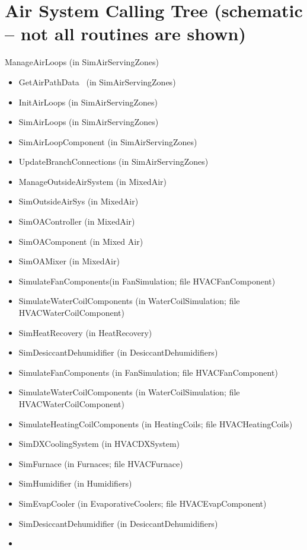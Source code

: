 \section{Air System Calling Tree (schematic -- not all routines are shown)}\label{air-system-calling-tree-schematic-not-all-routines-are-shown}

ManageAirLoops (in SimAirServingZones)

\begin{itemize}
\item
  GetAirPathData~ (in SimAirServingZones)
\item
  InitAirLoops (in SimAirServingZones)
\item
  SimAirLoops (in SimAirServingZones)
\item
  SimAirLoopComponent (in SimAirServingZones)
\item
  UpdateBranchConnections (in SimAirServingZones)
\item
  ManageOutsideAirSystem (in MixedAir)
\item
  SimOutsideAirSys (in MixedAir)
\item
  SimOAController (in MixedAir)
\item
  SimOAComponent (in Mixed Air)
\item
  SimOAMixer (in MixedAir)
\item
  SimulateFanComponents(in FanSimulation; file HVACFanComponent)
\item
  SimulateWaterCoilComponents (in WaterCoilSimulation; file HVACWaterCoilComponent)
\item
  SimHeatRecovery (in HeatRecovery)
\item
  SimDesiccantDehumidifier (in DesiccantDehumidifiers)
\item
  SimulateFanComponents (in FanSimulation; file HVACFanComponent)
\item
  SimulateWaterCoilComponents (in WaterCoilSimulation; file HVACWaterCoilComponent)
\item
  SimulateHeatingCoilComponents (in HeatingCoils; file HVACHeatingCoils)
\item
  SimDXCoolingSystem (in HVACDXSystem)
\item
  SimFurnace (in Furnaces; file HVACFurnace)
\item
  SimHumidifier (in Humidifiers)
\item
  SimEvapCooler (in EvaporativeCoolers; file HVACEvapComponent)
\item
  SimDesiccantDehumidifier (in DesiccantDehumidifiers)
\item

\end{itemize}
